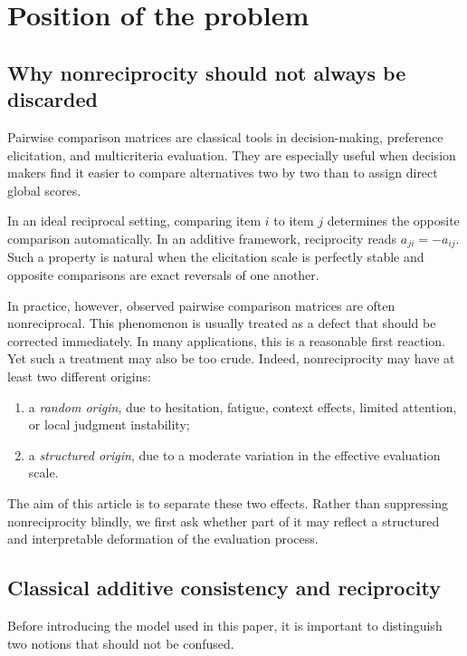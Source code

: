 \documentclass[11pt]{amsart}
\theoremstyle{definition}
\theoremstyle{plain}
\numberwithin{equation}{section}
\begin{document}
\section{Position of the problem}

\subsection{Why nonreciprocity should not always be discarded}

Pairwise comparison matrices are classical tools in decision-making, preference elicitation, and multicriteria evaluation. They are especially useful when decision makers find it easier to compare alternatives two by two than to assign direct global scores.

In an ideal reciprocal setting, comparing item $i$ to item $j$ determines the opposite comparison automatically. In an additive framework, reciprocity reads
\(
a_{ji}=-a_{ij}.
\)
Such a property is natural when the elicitation scale is perfectly stable and opposite comparisons are exact reversals of one another.

In practice, however, observed pairwise comparison matrices are often nonreciprocal. This phenomenon is usually treated as a defect that should be corrected immediately. In many applications, this is a reasonable first reaction. Yet such a treatment may also be too crude. Indeed, nonreciprocity may have at least two different origins:
\begin{enumerate}[label=\textup{(\arabic*)}]
\item a \emph{random origin}, due to hesitation, fatigue, context effects, limited attention, or local judgment instability;
\item a \emph{structured origin}, due to a moderate variation in the effective evaluation scale.
\end{enumerate}

The aim of this article is to separate these two effects. Rather than suppressing nonreciprocity blindly, we first ask whether part of it may reflect a structured and interpretable deformation of the evaluation process.

\subsection{Classical additive consistency and reciprocity}

Before introducing the model used in this paper, it is important to distinguish two notions that should not be confused.
\end{document}
